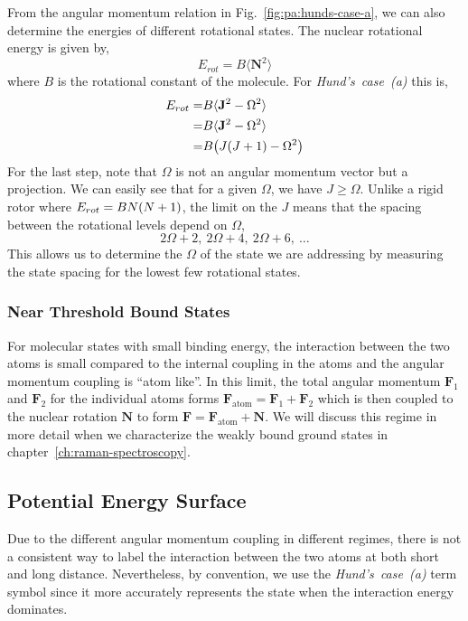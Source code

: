 From the angular momentum relation in Fig.~\ref{fig:pa:hunds-case-a},
we can also determine the energies of different rotational states.
The nuclear rotational energy is given by,
\[
  E_{rot}=B\langle \mathbf{N}^2 \rangle
\]
where $B$ is the rotational constant of the molecule.
For \textit{Hund's~case~(a)} this is,
\begin{align*}
  E_{rot}=&B\langle \mathbf{J}^2 - \Omega^2 \rangle\\
  =&B\langle \mathbf{J}^2 - \Omega^2 \rangle\\
  =&B{\left({J{\left({J+1}\right)}-\Omega^2}\right)}
\end{align*}
For the last step, note that $\Omega$ is not an angular momentum vector but a projection.
We can easily see that for a given $\Omega$, we have $J\geqslant\Omega$.
Unlike a rigid rotor where $E_{rot}=BN{\left({N+1}\right)}$,
the limit on the $J$ means that the spacing between the rotational levels depend on $\Omega$,
\[2\Omega+2,\ 2\Omega+4,\ 2\Omega+6,\ \dots\]
This allows us to determine the $\Omega$ of the state we are addressing
by measuring the state spacing for the lowest few rotational states.

\subsubsection{Near Threshold Bound States}
\label{ch:pa:structure:near-threshold}

For molecular states with small binding energy, the interaction between the two atoms is
small compared to the internal coupling in the atoms and
the angular momentum coupling is ``atom like''.
In this limit, the total angular momentum $\mathbf{F}_1$ and $\mathbf{F}_2$
for the individual atoms forms $\mathbf{F}_{\mathrm{atom}}=\mathbf{F}_1+\mathbf{F}_2$
which is then coupled to the nuclear rotation $\mathbf{N}$
to form $\mathbf{F}=\mathbf{F}_{\mathrm{atom}}+\mathbf{N}$.
We will discuss this regime in more detail
when we characterize the weakly bound ground states in chapter~\ref{ch:raman-spectroscopy}.

\subsection{Potential Energy Surface}
\label{ch:pa:pes}

Due to the different angular momentum coupling in different regimes,
there is not a consistent way to label the interaction between the two atoms
at both short and long distance.
Nevertheless, by convention, we use the \textit{Hund's~case~(a)} term symbol
since it more accurately represents the state when the interaction energy dominates.


